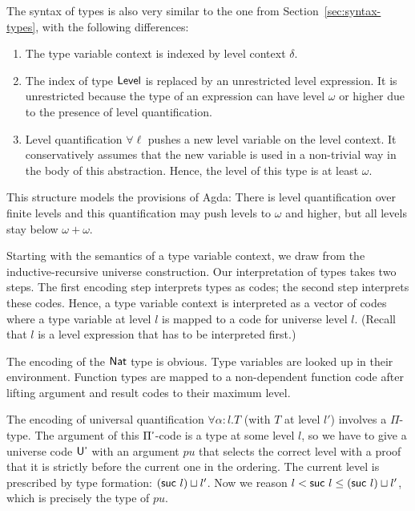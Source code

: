 \documentclass[manuscript,screen,review,anonymous]{acmart}
\begin{document}
\begin{minipage}{0.45\linewidth}
  \IRTEnv
\end{minipage}
\begin{minipage}{0.45\linewidth}
  \IRTEnvNi
\end{minipage}

The syntax of types is also very similar to the one from
Section~\ref{sec:syntax-types}, with the following differences:
\begin{enumerate}
\item The type variable context is indexed by level context $\delta$.
\item The index of type $\ALevel$ is replaced by an unrestricted level
  expression. It is unrestricted because the type of an expression can
  have level $\omega$ or higher due to the presence of level
  quantification.
\item Level quantification $\forall\ell$ pushes a new level variable on
  the level context. It conservatively assumes that the new variable
  is used in a non-trivial way in the body of this abstraction. Hence,
  the level of this type is at least $\omega$.
\end{enumerate}
This structure models the provisions of Agda: There is level
quantification over finite levels and this quantification may push
levels to $\omega$ and higher, but all levels stay below $\omega+\omega$.

\IRType

Starting with the semantics of a type variable context, we draw from
the inductive-recursive universe construction. Our interpretation of
types takes two steps. The first encoding step interprets types as
codes; the second step interprets these codes. Hence, a type variable
context is interpreted as a vector of codes where a type variable at
level $l$ is mapped to a code for universe level $l$. (Recall that $l$
is a level expression that has to be interpreted first.)

\IRFTSEAsFunction

The encoding of the $\ANat$ type is obvious.  Type variables are
looked up in their environment. Function types are mapped to a
non-dependent function code after lifting argument and result codes to
their maximum level.

The encoding of universal quantification $\forall
\alpha: l. T$ (with $T$ at level $l'$) involves a $\Pi$-type. The
argument of this $\APi$-code is a type at some level 
$l$, so we have to give a universe code $\AUp$ with an argument $pu$ that selects the correct
level with a proof that it is strictly before the current one in the
ordering. The current level is prescribed by type formation: $(\Asuc~
l) \sqcup l'$. Now we reason $l < \Asuc~l \le (\Asuc~ l) \sqcup l'$,
which is precisely the type of $pu$.
\end{document}
